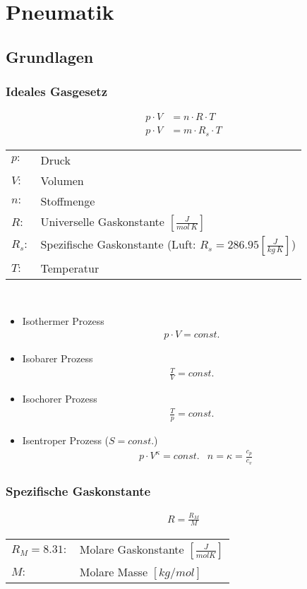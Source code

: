 \section{Pneumatik}
\subsection{Grundlagen}
\subsubsection{Ideales Gasgesetz}
\begin{align*}
p\cdot V  &= n \cdot R \cdot T \\
p \cdot V &= m \cdot R_s \cdot T
\end{align*}
\begin{tabular}{ll}
$p:$ & Druck \\
$V:$ & Volumen \\
$n:$ & Stoffmenge \\
$R:$ & Universelle Gaskonstante $[\frac{J}{mol \, K}]$ \\
$R_s:$ & Spezifische Gaskonstante (Luft: $R_s = 286.95 [\frac{J}{kg \, K}]$) \\
$T:$ & Temperatur
\end{tabular} \\

\begin{itemize}
\item Isothermer Prozess
\begin{align*}
p \cdot V = const.
\end{align*}
\item Isobarer Prozess
\begin{align*}
\frac{T}{V} = const. 
\end{align*}
\item Isochorer Prozess
\begin{align*}
\frac{T}{p} = const.
\end{align*}
\item Isentroper Prozess ($S=const.$)
\begin{align*}
&p\cdot V^\kappa = const.
&n=  \kappa = \frac{c_p}{c_v}
\end{align*}
\end{itemize}

\subsubsection{Spezifische Gaskonstante}
\begin{align*}
R = \frac{R_M}{M}
\end{align*}
\begin{tabular}{ll}
$R_M = 8.31:$ & Molare Gaskonstante $[\frac{J}{mol K}]$ \\
$M:$ & Molare Masse $[kg/mol]$
\end{tabular} \\


